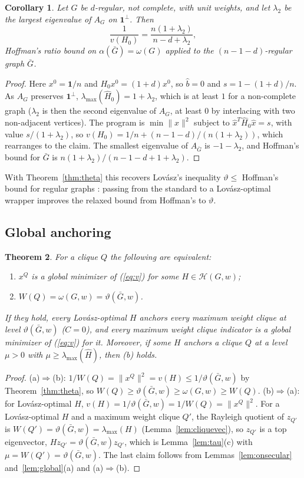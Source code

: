 \documentclass[11pt]{article}
\newtheorem{thm}{Theorem}[section]
\newtheorem{cor}[thm]{Corollary}
\theoremstyle{definition}
\theoremstyle{remark}
\newcommand{\Hc}{\mathcal{H}}
\newcommand{\hH}{\hat{H}}
\newcommand{\hb}{\hat{b}}
\newcommand{\hx}{\hat{x}}
\newcommand{\one}{\mathbf{1}}
\newcommand{\lmax}{\lambda_{\max}}
\newcommand{\vt}{\vartheta(\bar G,w)}
\newcommand{\om}{\omega(G,w)}
\begin{document}
\begin{cor}
\label{cor:hoffman}
Let $G$ be $d$-regular, not complete, with unit weights, and let
$\lambda_2$ be the largest eigenvalue of $A_G$ on $\one^\perp$. Then
\[ \frac{1}{v(H_0)}=\frac{n(1+\lambda_2)}{n-d+\lambda_2}, \]
Hoffman's ratio bound \cite{Ho70} on $\alpha(\bar G)=\omega(G)$ applied to
the $(n-1-d)$-regular graph $\bar G$.
\end{cor}
\begin{proof}
Here $x^0=\one/n$ and $H_0x^0=(1+d)x^0$, so $\hb=0$ and
$s=1-(1+d)/n$. As $A_G$ preserves $\one^\perp$, $\lmax(\hH_0)=1+\lambda_2$,
which is at least $1$ for a non-complete graph ($\lambda_2$ is then the
second eigenvalue of $A_G$, at least $0$ by interlacing with two
non-adjacent vertices). The program is
$\min\|\hx\|^2$ subject to $\hx^T\hH_0\hx=s$, with value
$s/(1+\lambda_2)$, so $v(H_0)=1/n+(n-1-d)/(n(1+\lambda_2))$, which
rearranges to the claim. The smallest eigenvalue of $A_{\bar G}$ is
$-1-\lambda_2$, and Hoffman's bound for $\bar G$ is
$n(1+\lambda_2)/(n-1-d+1+\lambda_2)$.
\end{proof}

With Theorem~\ref{thm:theta} this recovers Lov\'asz's inequality
$\vartheta\leq$ Hoffman's bound for regular graphs \cite[Theorem 9]{L79}:
passing from the standard to a Lov\'asz-optimal wrapper improves the relaxed
bound from Hoffman's to $\vartheta$.

\subsection{Global anchoring}

\begin{thm}
\label{thm:global}
For a clique $Q$ the following are equivalent:
\begin{enumerate}
\item[(a)] $x^Q$ is a global minimizer of (\ref{eq:v}) for some
$H\in\Hc(G,w)$;
\item[(b)] $W(Q)=\om=\vt$.
\end{enumerate}
If they hold, every Lov\'asz-optimal $H$ anchors every maximum weight clique
at level $\vt$ ($C=0$), and every maximum weight clique indicator is a
global minimizer of (\ref{eq:v}) for it. Moreover, if some $H$ anchors a
clique $Q$ at a level $\mu>0$ with $\mu\geq\lmax(\hH)$, then (b) holds.
\end{thm}
\begin{proof}
(a)$\Rightarrow$(b): $1/W(Q)=\|x^Q\|^2=v(H)\leq1/\vt$ by
Theorem~\ref{thm:theta}, so $W(Q)\geq\vt\geq\om\geq W(Q)$.
(b)$\Rightarrow$(a): for Lov\'asz-optimal $H$, $v(H)=1/\vt=1/W(Q)=\|x^Q\|^2$.
For a Lov\'asz-optimal $H$ and a maximum weight clique $Q'$, the Rayleigh
quotient of $z_{Q'}$ is $W(Q')=\vt=\lmax(H)$ (Lemma~\ref{lem:cliquevec}),
so $z_{Q'}$ is a top eigenvector, $Hz_{Q'}=\vt z_{Q'}$, which is
Lemma~\ref{lem:tau}(c) with $\mu=W(Q')=\vt$. The last claim follows from
Lemmas~\ref{lem:onsecular} and~\ref{lem:global}(a) and (a)$\Rightarrow$(b).
\end{proof}
\end{document}
